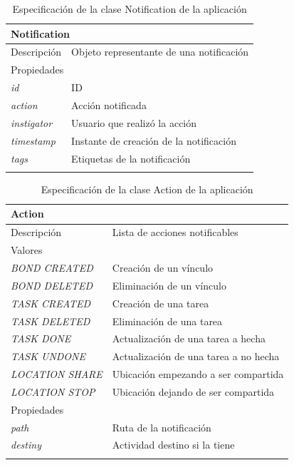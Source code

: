 \begin{longtable}{|p{} p{}|}
    \hline
    \multicolumn{2}{|l|}{Notification} \\ \hline \hline
    Descripción      & Objeto representante de una notificación \\ \hline
    \multicolumn{2}{|l|}{Propiedades} \\
    \emph{id}  & ID \\
    \emph{action}  & Acción notificada \\
    \emph{instigator} & Usuario que realizó la acción \\
    \emph{timestamp}  & Instante de creación de la notificación \\
    \emph{tags}  & Etiquetas de la notificación \\  \hline
    \caption{Especificación de la clase Notification de la aplicación}
    \label{class:app:notification}
\end{longtable}

\begin{longtable}{|p{} p{}|}
    \hline
    \multicolumn{2}{|l|}{Action} \\ \hline \hline
    Descripción      & Lista de acciones notificables \\ \hline
    \multicolumn{2}{|l|}{Valores} \\
    \emph{BOND CREATED}  & Creación de un vínculo  \\
    \emph{BOND DELETED}  & Eliminación de un vínculo  \\
    \emph{TASK CREATED}  & Creación de una tarea  \\
    \emph{TASK DELETED}  & Eliminación de una tarea  \\
    \emph{TASK DONE}  & Actualización de una tarea a hecha  \\
    \emph{TASK UNDONE}  & Actualización de una tarea a no hecha  \\
    \emph{LOCATION SHARE}  & Ubicación empezando a ser compartida  \\
    \emph{LOCATION STOP}  & Ubicación dejando de ser compartida  \\ \hline
    \multicolumn{2}{|l|}{Propiedades} \\
    \emph{path}  & Ruta de la notificación \\
    \emph{destiny}  & Actividad destino si la tiene \\  \hline
    \caption{Especificación de la clase Action de la aplicación}
    \label{class:app:action}
\end{longtable}

